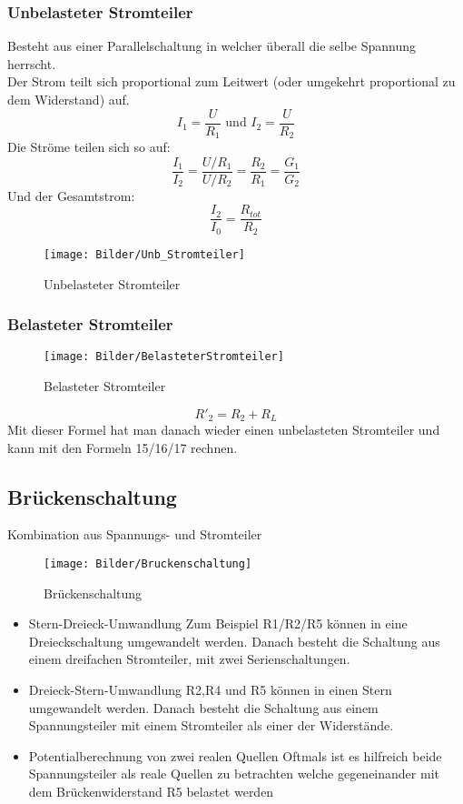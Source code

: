 \documentclass{article}
\begin{document}
\subsubsection{Unbelasteter Stromteiler}
Besteht aus einer Parallelschaltung in welcher überall die selbe Spannung herrscht. \\
Der Strom teilt sich proportional zum Leitwert (oder umgekehrt proportional zu dem Widerstand) auf. 
\begin{equation}
	I_1 = \frac{U}{R_1} \textrm{ und } I_2 = \frac{U}{R_2}
\end{equation} 
Die Ströme teilen sich so auf:
\begin{equation}
\frac{I_1}{I_2} = \frac{U / R_1}{U / R_2} = \frac{R_2}{R_1} = \frac{G_1}{G_2}
\end{equation}
Und der Gesamtstrom:
\begin{equation}
\frac{I_2}{I_0} = \frac{R_{tot}}{R_2} 
\end{equation}
\begin{figure}[htbp]
	\centering
	\texttt{[image: Bilder/Unb\_Stromteiler]}
	\caption{Unbelasteter Stromteiler}
\end{figure}
\subsubsection{Belasteter Stromteiler}
\begin{figure}[htbp]
	\centering
	\texttt{[image: Bilder/BelasteterStromteiler]}
	\caption{Belasteter Stromteiler}
\end{figure}
\begin{equation}
	R'_2 = R_2 + R_L
\end{equation}
Mit dieser Formel hat man danach wieder einen unbelasteten Stromteiler und kann mit den Formeln 15/16/17 rechnen.
\subsection{Brückenschaltung}
Kombination aus Spannungs- und Stromteiler
\begin{figure}[htbp]
	\centering
	\texttt{[image: Bilder/Bruckenschaltung]}
	\caption{Brückenschaltung}
\end{figure}
\begin{itemize}
	\item Stern-Dreieck-Umwandlung 
	\subitem Zum Beispiel R1/R2/R5 können in eine Dreieckschaltung umgewandelt werden. Danach besteht die Schaltung aus einem dreifachen Stromteiler, mit zwei Serienschaltungen. 
	\item Dreieck-Stern-Umwandlung
	\subitem R2,R4 und R5 können in einen Stern umgewandelt werden. Danach besteht die Schaltung aus einem Spannungsteiler mit einem Stromteiler als einer der Widerstände.
	\item Potentialberechnung von zwei realen Quellen
	\subitem Oftmals ist es hilfreich beide Spannungsteiler als reale Quellen zu betrachten welche  gegeneinander mit dem Brückenwiderstand R5 belastet werden
\end{itemize}
\end{document}
